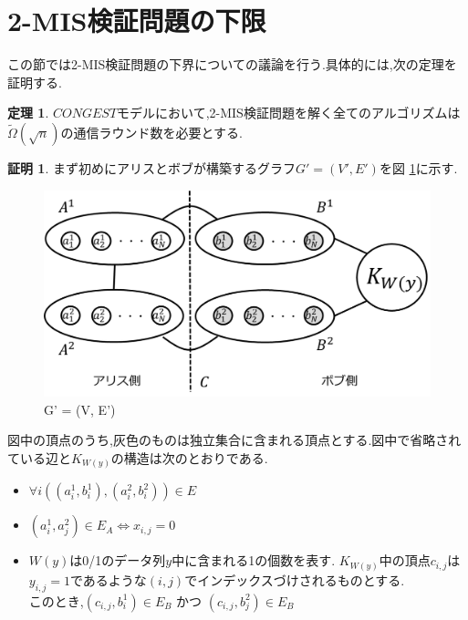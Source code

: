 \documentclass[12]{thesis}
\theoremstyle{definition}
\newtheorem{theorem}{定理}[chapter]
\newtheorem*{prf*}{証明}
\begin{document}
\section{2-MIS検証問題の下限}
この節では2-MIS検証問題の下界についての議論を行う.具体的には,次の定理を証明する. 
\begin{theorem}
$CONGEST$モデルにおいて,2-MIS検証問題を解く全てのアルゴリズムは$\tilde{\Omega} (\sqrt{n})$の通信ラウンド数を必要とする.
\end{theorem}
\begin{prf*}
まず初めにアリスとボブが構築するグラフ$G' = (V', E')$を図 \ref{2MIS}に示す. 

\begin{figure}[ht]
\begin{center}
\includegraphics[width=120mm]{2MIS.png}
\end{center}
\caption{G' = (V, E')}
\label{2MIS}
\end{figure}

図中の頂点のうち,灰色のものは独立集合に含まれる頂点とする.図中で省略されている辺と$K_{W(y)}$の構造は次のとおりである.
\begin{itemize}
\item $\forall i((a_{i}^{1}, b_{i}^{1}), (a_{i}^{2}, b_{i}^{2})) \in E$
\item $(a_{i}^{1}, a_{j}^{2}) \in E_{A} \Leftrightarrow x_{i, j} = 0$
\item $W(y)$は0/1のデータ列$y$中に含まれる1の個数を表す.
$K_{W(y)}$中の頂点$c_{i, j}$は$y_{i, j} = 1$であるような$(i, j)$でインデックスづけされるものとする. \\
このとき,$(c_{i, j}, b_{i}^{1}) \in E_{B}$ かつ $(c_{i, j}, b_{j}^{2}) \in E_{B}$
\end{itemize}


\end{prf*}
\end{document}
